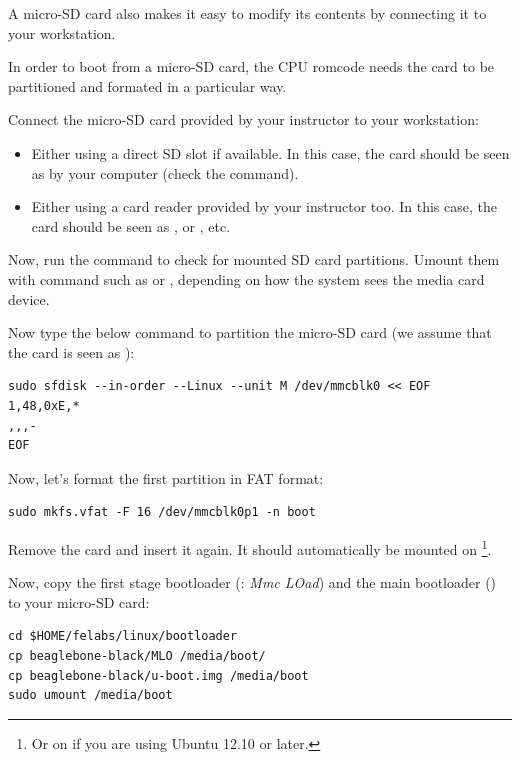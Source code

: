 A micro-SD card also makes it easy to modify its contents by connecting
it to your workstation.

In order to boot from a micro-SD card, the CPU romcode needs the card
to be partitioned and formated in a particular way.

Connect the micro-SD card provided by your instructor to your
workstation:

\begin{itemize}
\item Either using a direct SD slot if available.
      In this case, the card should be seen as  by
      your computer (check the  command).
\item Either using a card reader provided by your instructor too.
      In this case, the card should be seen as , or
      , etc.
\end{itemize}

Now, run the  command to check for mounted SD card
partitions. Umount them with command such as  or , depending on how
the system sees the media card device.

Now type the below command to partition the micro-SD card
(we assume that the card is seen as ):

\begin{verbatim}
sudo sfdisk --in-order --Linux --unit M /dev/mmcblk0 << EOF
1,48,0xE,*
,,,-
EOF
\end{verbatim}

Now, let's format the first partition in FAT format:

\begin{verbatim}
sudo mkfs.vfat -F 16 /dev/mmcblk0p1 -n boot
\end{verbatim}

Remove the card and insert it again. It should automatically be mounted
on  \footnote{Or on  if you
are using Ubuntu 12.10 or later.}.

Now, copy the first stage bootloader (: {\em Mmc LOad}) and the main
bootloader () to your micro-SD card:

\begin{verbatim}
cd $HOME/felabs/linux/bootloader
cp beaglebone-black/MLO /media/boot/
cp beaglebone-black/u-boot.img /media/boot
sudo umount /media/boot
\end{verbatim}

